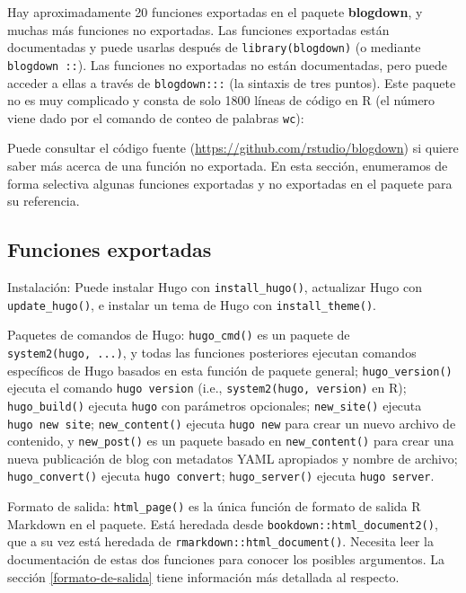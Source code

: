 \documentclass[12pt,]{krantz}
\theoremstyle{definition}
\theoremstyle{definition}
\theoremstyle{definition}
\theoremstyle{remark}
\begin{document}
Hay aproximadamente 20 funciones exportadas en el
paquete \textbf{blogdown}, y muchas más funciones no exportadas. Las
funciones exportadas están documentadas y puede usarlas después de
\texttt{library(blogdown)} (o mediante \texttt{blogdown\ ::}). Las
funciones no exportadas no están documentadas, pero puede acceder a
ellas a través de \texttt{blogdown:::} (la sintaxis de tres puntos).
Este paquete no es muy complicado y consta de solo 1800 líneas de código
en R (el número viene dado por el comando de conteo de palabras
\texttt{wc}):

Puede consultar el código fuente
(\url{https://github.com/rstudio/blogdown}) si quiere saber más acerca
de una función no exportada. En esta sección, enumeramos de forma
selectiva algunas funciones exportadas y no exportadas en el paquete
para su referencia.

\hypertarget{funciones-exportadas}{%
\subsection{Funciones exportadas}\label{funciones-exportadas}}

Instalación: Puede instalar Hugo con \texttt{install\_hugo()},
actualizar Hugo con \texttt{update\_hugo()}, e instalar un tema de Hugo
con \texttt{install\_theme()}.

Paquetes de comandos de Hugo: \texttt{hugo\_cmd()} es un paquete de
\texttt{system2(\textquotesingle{}hugo\textquotesingle{},\ ...)}, y
todas las funciones posteriores ejecutan comandos específicos de Hugo
basados en esta función de paquete general; \texttt{hugo\_version()}
ejecuta el comando \texttt{hugo\ version} (i.e.,
\texttt{system2(\textquotesingle{}hugo\textquotesingle{},\ \textquotesingle{}version\textquotesingle{})}
en R); \texttt{hugo\_build()} ejecuta \texttt{hugo} con parámetros
opcionales; \texttt{new\_site()} ejecuta \texttt{hugo\ new\ site};
\texttt{new\_content()} ejecuta \texttt{hugo\ new} para crear un nuevo
archivo de contenido, y \texttt{new\_post()} es un paquete basado en
\texttt{new\_content()} para crear una nueva publicación de blog con
metadatos YAML apropiados y nombre de archivo; \texttt{hugo\_convert()}
ejecuta \texttt{hugo\ convert}; \texttt{hugo\_server()} ejecuta
\texttt{hugo\ server}.

Formato de salida: \texttt{html\_page()} es la única función de formato
de salida R Markdown en el paquete. Está heredada desde
\texttt{bookdown::html\_document2()}, que a su vez está heredada de
\texttt{rmarkdown::html\_document()}. Necesita leer la documentación de
estas dos funciones para conocer los posibles argumentos. La sección
\ref{formato-de-salida} tiene información más detallada al respecto.
\end{document}
